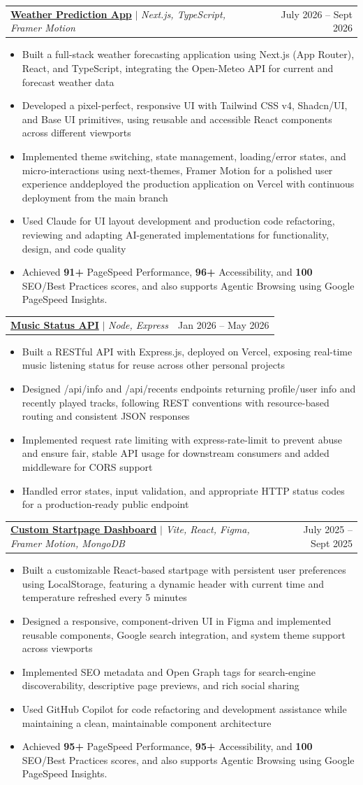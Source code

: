 \documentclass[letterpaper,11pt]{article}
\makeatletter
\newcommand{\resumeItem}[1]{
  \item\small{
    {#1 \vspace{-2pt}}
  }
}
\newcommand{\resumeProjectHeading}[2]{
    \item
    \begin{tabular*}{0.97\textwidth}{l@{\extracolsep{\fill}}r}
      \small#1 & #2 \\
    \end{tabular*}\vspace{-7pt}
}
\newcommand{\resumeItemListStart}{\begin{itemize}}
\newcommand{\resumeItemListEnd}{\end{itemize}\vspace{-5pt}}
\makeatother
\begin{document}
\resumeProjectHeading
{\textbf{\href{https://weather4pp.vercel.app/}{Weather Prediction App}} $|$ \emph{Next.js, TypeScript, Framer Motion}}{July 2026 -- Sept 2026}
\resumeItemListStart
\resumeItem{Built a full-stack weather forecasting application using Next.js (App Router), React, and TypeScript, integrating the Open-Meteo API for current and forecast weather data}
\resumeItem{Developed a pixel-perfect, responsive UI with Tailwind CSS v4, Shadcn/UI, and Base UI primitives, using reusable and accessible React components across different viewports}
\resumeItem{Implemented theme switching, state management, loading/error states, and micro-interactions using next-themes, Framer Motion for a polished user experience anddeployed the production application on Vercel with continuous deployment from the main branch}
\resumeItem{Used Claude for UI layout development and production code refactoring, reviewing and adapting AI-generated implementations for functionality, design, and code quality}
\resumeItem{Achieved \textbf{91+} PageSpeed Performance, \textbf{96+} Accessibility, and \textbf{100} SEO/Best Practices scores, and also supports Agentic Browsing using Google PageSpeed Insights.}
\resumeItemListEnd

\resumeProjectHeading
{\textbf{\href{https://first-fm-app.vercel.app/}{Music Status API}} $|$ \emph{Node, Express}}{Jan 2026 -- May 2026}
\resumeItemListStart
\resumeItem{Built a RESTful API with Express.js, deployed on Vercel, exposing real-time music listening status for reuse across other personal projects}
\resumeItem{Designed /api/info and /api/recents endpoints returning profile/user info and recently played tracks, following REST conventions with resource-based routing and consistent JSON responses}
\resumeItem{Implemented request rate limiting with express-rate-limit to prevent abuse and ensure fair, stable API usage for downstream consumers and added middleware for CORS support}
\resumeItem{Handled error states, input validation, and appropriate HTTP status codes for a production-ready public endpoint}
\resumeItemListEnd

\resumeProjectHeading
{\textbf{\href{https://4nubhav-startpage.vercel.app/}{Custom Startpage Dashboard}} $|$ \emph{Vite, React, Figma, Framer Motion, MongoDB}}{July 2025 -- Sept 2025}
\resumeItemListStart
\resumeItem{Built a customizable React-based startpage with persistent user preferences using LocalStorage, featuring a dynamic header with current time and temperature refreshed every 5 minutes}
\resumeItem{Designed a responsive, component-driven UI in Figma and implemented reusable components, Google search integration, and system theme support across viewports}
\resumeItem{Implemented SEO metadata and Open Graph tags for search-engine discoverability, descriptive page previews, and rich social sharing}
\resumeItem{Used GitHub Copilot for code refactoring and development assistance while maintaining a clean, maintainable component architecture}
\resumeItem{Achieved \textbf{95+} PageSpeed Performance, \textbf{95+} Accessibility, and \textbf{100} SEO/Best Practices scores, and also supports Agentic Browsing using Google PageSpeed Insights.}
\resumeItemListEnd
\end{document}
